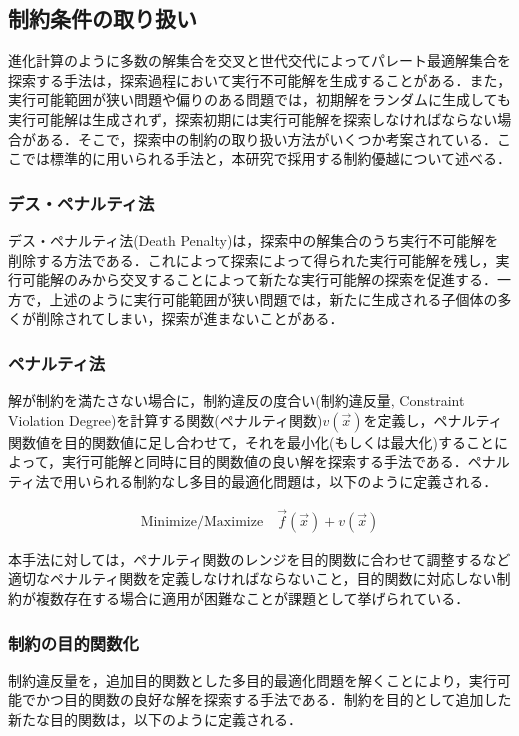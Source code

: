 \subsection{制約条件の取り扱い\cite{Coello02, Harada07}}
進化計算のように多数の解集合を交叉と世代交代によってパレート最適解集合を探索する手法は，探索過程において実行不可能解を生成することがある．また，実行可能範囲が狭い問題や偏りのある問題では，初期解をランダムに生成しても実行可能解は生成されず，探索初期には実行可能解を探索しなければならない場合がある．そこで，探索中の制約の取り扱い方法がいくつか考案されている．ここでは標準的に用いられる手法と，本研究で採用する制約優越について述べる．

\subsubsection{デス・ペナルティ法}
デス・ペナルティ法(Death Penalty)は，探索中の解集合のうち実行不可能解を削除する方法である．これによって探索によって得られた実行可能解を残し，実行可能解のみから交叉することによって新たな実行可能解の探索を促進する．一方で，上述のように実行可能範囲が狭い問題では，新たに生成される子個体の多くが削除されてしまい，探索が進まないことがある．

\subsubsection{ペナルティ法}
解が制約を満たさない場合に，制約違反の度合い(制約違反量, Constraint Violation Degree)を計算する関数(ペナルティ関数)$v(\vec{x})$を定義し，ペナルティ関数値を目的関数値に足し合わせて，それを最小化(もしくは最大化)することによって，実行可能解と同時に目的関数値の良い解を探索する手法である．ペナルティ法で用いられる制約なし多目的最適化問題は，以下のように定義される．

\begin{align}
    \mbox{Minimize/Maximize} \quad \vec{f}(\vec{x}) + v(\vec{x})
\end{align}

本手法に対しては，ペナルティ関数のレンジを目的関数に合わせて調整するなど適切なペナルティ関数を定義しなければならないこと，目的関数に対応しない制約が複数存在する場合に適用が困難なことが課題として挙げられている．

\subsubsection{制約の目的関数化}
制約違反量を，追加目的関数とした多目的最適化問題を解くことにより，実行可能でかつ目的関数の良好な解を探索する手法である．制約を目的として追加した新たな目的関数は，以下のように定義される．

